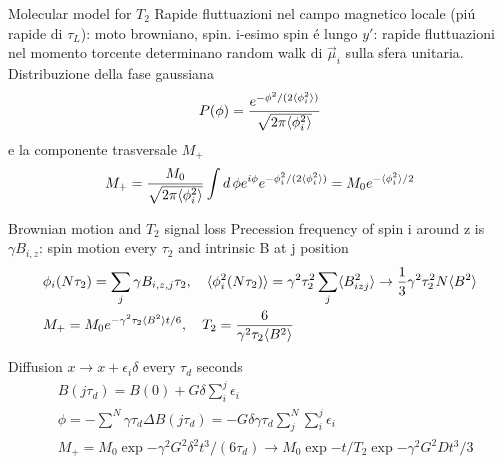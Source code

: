\begin{frame}{Molecular model for $T_2$}
Rapide fluttuazioni nel campo magnetico locale (pi\'u rapide di $\tau_L$): moto browniano, spin.
i-esimo spin \'e lungo $y'$: rapide fluttuazioni nel momento torcente determinano random walk di $\vec{\mu}_i$ sulla sfera unitaria. Distribuzione della fase gaussiana
\begin{equation*}
P(\phi)=\frac{e^{-\phi^2/(2\langle \phi_i^2 \rangle)}}{\sqrt{2\pi\langle \phi_i^2 \rangle}}    
\end{equation*}
e la componente trasversale $M_+$
\begin{equation*}
M_+=\frac{M_0}{\sqrt{2\pi\langle \phi_i^2 \rangle}}\int d\,\phi e^{i\phi}e^{-\phi_i^2/(2\langle \phi_i^2 \rangle)}=M_0e^{-\langle \phi_i^2 \rangle/2}
\end{equation*}
\begin{block}{Brownian motion and $T_2$ signal loss}
Precession frequency of spin i around z is $\gamma B_{i,z}$: spin motion every $\tau_2$ and intrinsic B at j position
\begin{align*}
&\phi_i(N\tau_2)=\sum_j\gamma B_{i,z,j}\tau_2,\quad \langle \phi_i^2(N\tau_2) \rangle=\gamma^2\tau_2^2\sum_j\langle B_{izj}^2 \rangle\to\frac{1}{3}\gamma^2\tau_2^2N\langle B^2 \rangle\\
&M_+=M_0e^{-\gamma^2\tau_2\langle B^2 \rangle t/6},\quad T_2=\frac{6}{\gamma^2\tau_2\langle B^2 \rangle}
\end{align*}
\end{block}
\end{frame}

\begin{frame}{Diffusion}
$x\to x+\epsilon_i\delta$ every $\tau_d$ seconds
\begin{align*}
&B(j\tau_d)=B(0)+G\delta\sum_i^j\epsilon_i\\
&\phi=-\sum^N\gamma\tau_d\Delta B(j\tau_d)=-G\delta\gamma\tau_d\sum_j^N\sum_i^j\epsilon_i\\
&M_+=M_0\exp{-\gamma^2 G^2\delta^2 t^3/(6\tau_d)}\to M_0\exp{-t/T_2}\exp{-\gamma^2 G^2Dt^3/3}
\end{align*}
\end{frame}